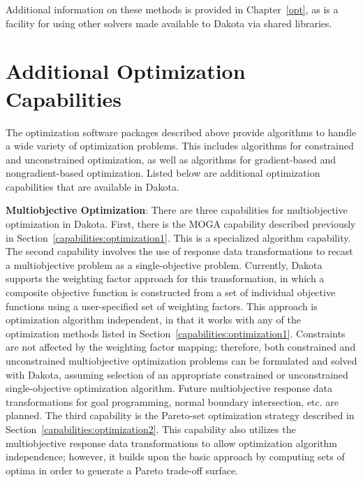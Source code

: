 Additional information on these methods is provided in Chapter~\ref{opt},
as is a facility for using other solvers made available to Dakota
via shared libraries.

\section{Additional Optimization Capabilities}\label{capabilities:additional}

The optimization software packages described above provide algorithms
to handle a wide variety of optimization problems. This includes
algorithms for constrained and unconstrained optimization, as well as
algorithms for gradient-based and nongradient-based
optimization. Listed below are additional optimization capabilities
that are available in Dakota.

\textbf{Multiobjective Optimization}:
There are three capabilities for multiobjective optimization in
Dakota.  First, there is the MOGA capability described previously in
Section~\ref{capabilities:optimization1}.  This is a specialized
algorithm capability.  The second capability involves the use of
response data transformations to recast a multiobjective problem as a
single-objective problem.  Currently, Dakota supports the weighting
factor approach for this transformation, in which a composite
objective function is constructed from a set of individual objective
functions using a user-specified set of weighting factors.  This
approach is optimization algorithm independent, in that it works with
any of the optimization methods listed in
Section~\ref{capabilities:optimization1}.  Constraints are not
affected by the weighting factor mapping; therefore, both constrained
and unconstrained multiobjective optimization problems can be
formulated and solved with Dakota, assuming selection of an
appropriate constrained or unconstrained single-objective optimization
algorithm.  Future multiobjective response data transformations for
goal programming, normal boundary intersection, etc. are planned.  The
third capability is the Pareto-set optimization strategy described in
Section~\ref{capabilities:optimization2}.  This capability also
utilizes the multiobjective response data transformations to allow
optimization algorithm independence; however, it builds upon the basic
approach by computing sets of optima in order to generate a Pareto
trade-off surface.

